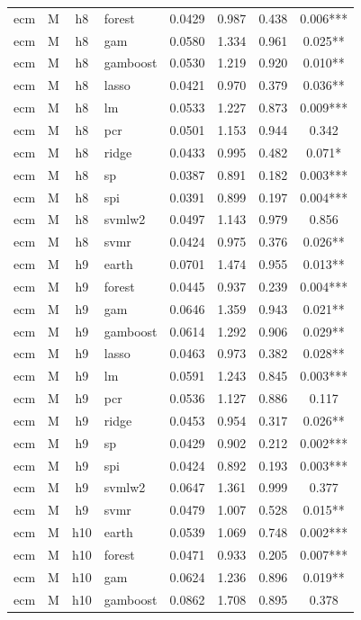 \begin{ThreePartTable}
\begin{longtable}[t]{llclcccc}
ecm & M & h8 & forest & 0.0429 & 0.987 & 0.438 & 0.006***\\
ecm & M & h8 & gam & 0.0580 & 1.334 & 0.961 & 0.025**\\
ecm & M & h8 & gamboost & 0.0530 & 1.219 & 0.920 & 0.010**\\
ecm & M & h8 & lasso & 0.0421 & 0.970 & 0.379 & 0.036**\\
ecm & M & h8 & lm & 0.0533 & 1.227 & 0.873 & 0.009***\\
ecm & M & h8 & pcr & 0.0501 & 1.153 & 0.944 & 0.342\\
ecm & M & h8 & ridge & 0.0433 & 0.995 & 0.482 & 0.071*\\
ecm & M & h8 & sp & 0.0387 & 0.891 & 0.182 & 0.003***\\
ecm & M & h8 & spi & 0.0391 & 0.899 & 0.197 & 0.004***\\
ecm & M & h8 & svmlw2 & 0.0497 & 1.143 & 0.979 & 0.856\\
ecm & M & h8 & svmr & 0.0424 & 0.975 & 0.376 & 0.026**\\
\addlinespace
ecm & M & h9 & earth & 0.0701 & 1.474 & 0.955 & 0.013**\\
ecm & M & h9 & forest & 0.0445 & 0.937 & 0.239 & 0.004***\\
ecm & M & h9 & gam & 0.0646 & 1.359 & 0.943 & 0.021**\\
ecm & M & h9 & gamboost & 0.0614 & 1.292 & 0.906 & 0.029**\\
ecm & M & h9 & lasso & 0.0463 & 0.973 & 0.382 & 0.028**\\
ecm & M & h9 & lm & 0.0591 & 1.243 & 0.845 & 0.003***\\
ecm & M & h9 & pcr & 0.0536 & 1.127 & 0.886 & 0.117\\
ecm & M & h9 & ridge & 0.0453 & 0.954 & 0.317 & 0.026**\\
ecm & M & h9 & sp & 0.0429 & 0.902 & 0.212 & 0.002***\\
ecm & M & h9 & spi & 0.0424 & 0.892 & 0.193 & 0.003***\\
ecm & M & h9 & svmlw2 & 0.0647 & 1.361 & 0.999 & 0.377\\
ecm & M & h9 & svmr & 0.0479 & 1.007 & 0.528 & 0.015**\\
\addlinespace
ecm & M & h10 & earth & 0.0539 & 1.069 & 0.748 & 0.002***\\
ecm & M & h10 & forest & 0.0471 & 0.933 & 0.205 & 0.007***\\
ecm & M & h10 & gam & 0.0624 & 1.236 & 0.896 & 0.019**\\
ecm & M & h10 & gamboost & 0.0862 & 1.708 & 0.895 & 0.378\\

\end{longtable}
\end{ThreePartTable}
